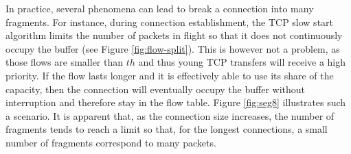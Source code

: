 \documentclass[preprint,12pt]{elsarticle}
\begin{document}
In practice, several phenomena can lead to break a connection into many fragments. For instance,  during connection establishment, the TCP slow start algorithm limits the number of packets in flight so that it does not continuously occupy the buffer (see Figure \ref{fig:flow-split}). This is however not a problem, as those flows are smaller than $th$ and thus young  TCP transfers will receive a high priority. If the flow lasts longer and it is effectively able to use its share of the capacity, then the connection will eventually occupy  the buffer without interruption and therefore stay in the flow table. Figure \ref{fig:seg8} illustrates such a scenario. It is apparent that, as the connection size increases, the number of fragments tends to reach a limit so that, for the longest connections, a small number of fragments correspond to many packets.


\end{document}
